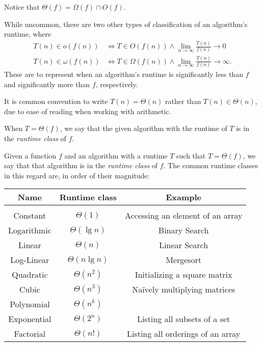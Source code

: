 \documentclass{article}
\begin{document}
 \begin{remark}
  Notice that $\Theta(f) = \Omega(f) \cap O(f)$.
 \end{remark}
 \begin{remark}
  While uncommon, there are two other types of classification of an algorithm's runtime, where
  \begin{align*}
   T(n) \in o(f(n)) &\Longleftrightarrow T\in O(f(n)) \land  \lim_{n\to\infty}\frac{T(n)}{f(n)}\to0 \\
   T(n) \in \omega(f(n)) &\Longleftrightarrow T\in \Omega(f(n)) \land  \lim_{n\to\infty}\frac{T(n)}{f(n)}\to\infty.
  \end{align*}
  These are to represent when an algorithm's runtime is significantly less than $f$ and significantly more than $f$, respectively. \cite{blum06, roughgarden22}
 \end{remark}
 \begin{remark}
  It is common convention to write $T(n) = \Theta(n)$ rather than $T(n) \in \Theta(n)$, due to ease of reading when working with arithmetic.
 \end{remark}
 \begin{remark}
  When $T = \Theta(f)$, we say that the given algorithm with the runtime of $T$ is in the \emph{runtime class} of $f$.
 \end{remark}

 \begin{definition}\label{def:RunClass}
  Given a function $f$ and an algorithm with a runtime $T$ such that $T=\Theta(f)$, we say that that algorithm is in the \emph{runtime class} of $f$. The common runtime classes in this regard are, in order of their magnitude:

  \begin{center}
  \begin{tabular}{c | c | c} %
   \textbf{Name} & \textbf{Runtime class} & \textbf{Example} \\
   \hline        &                        & \\[-.9em]
   Constant      & $\Theta(1)$            & Accessing an element of an array \\
   Logarithmic   & $\Theta(\lg n)$        & Binary Search \\
   Linear        & $\Theta(n)$            & Linear Search \\
   Log-Linear    & $\Theta(n\lg n)$       & Mergesort \\
   Quadratic     & $\Theta(n^2)$          & Initializing a square matrix \\
   Cubic         & $\Theta(n^3)$          & Na\"ively multiplying matrices \\
   Polynomial    & $\Theta(n^k)$          & \\
   Exponential   & $\Theta(2^n)$          & Listing all subsets of a set \\
   Factorial     & $\Theta(n!)$           & Listing all orderings of an array
  \end{tabular}
  \end{center}\cite{roughgarden22}
 \end{definition}
\end{document}

